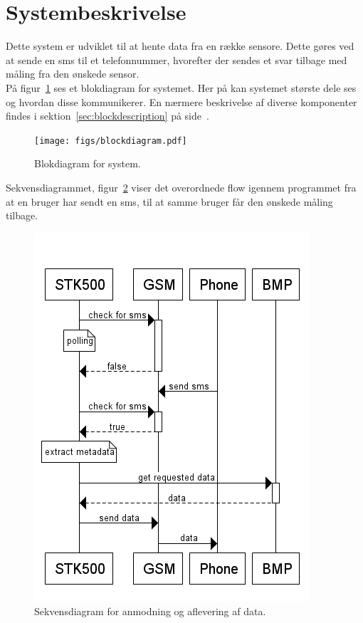 \section{Systembeskrivelse}
	
Dette system er udviklet til at hente data fra en række sensore. Dette gøres ved at sende en sms til et telefonnummer, hvorefter der sendes et svar tilbage med måling fra den ønskede sensor.\\

På figur~\ref{fig:blockdiagram} ses et blokdiagram for systemet. Her på kan systemet største dele ses og hvordan disse kommunikerer. En nærmere beskrivelse af diverse komponenter findes i sektion~\ref{sec:blockdescription} på side~\pageref{sec:blockdescription}.

\vskip 0.5cm
\begin{figure}[h]
	\centering
	\texttt{[image: figs/blockdiagram.pdf]}
	\caption{Blokdiagram for system.}
	\label{fig:blockdiagram}
\end{figure}
\vskip 0.5cm

Sekvensdiagrammet, figur~\ref{fig:seq-getdata} viser det overordnede flow igennem programmet fra at en bruger har sendt en sms, til at samme bruger får den ønskede måling tilbage.

\begin{figure}[h]
	\centering
	\includegraphics[width=0.56\linewidth]{figs/seq-getdata.png}
	\caption{Sekvensdiagram for anmodning og aflevering af data.}
	\label{fig:seq-getdata}
\end{figure}
